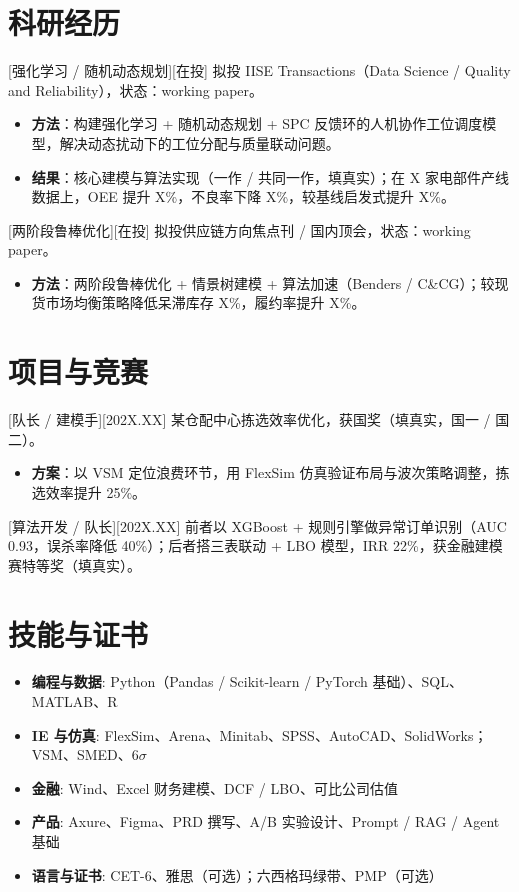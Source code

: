 \documentclass{resume}
\begin{document}
\section{科研经历}

[强化学习 / 随机动态规划][在投]
{ 拟投 IISE Transactions（Data Science / Quality and Reliability），状态：working paper。}

\begin{itemize}
  \item \textbf{方法}：构建强化学习 + 随机动态规划 + SPC 反馈环的人机协作工位调度模型，解决动态扰动下的工位分配与质量联动问题。
  \item \textbf{结果}：核心建模与算法实现（一作 / 共同一作，填真实）；在 X 家电部件产线数据上，OEE 提升 X\%，不良率下降 X\%，较基线启发式提升 X\%。
\end{itemize}

[两阶段鲁棒优化][在投]
{ 拟投供应链方向焦点刊 / 国内顶会，状态：working paper。}

\begin{itemize}
  \item \textbf{方法}：两阶段鲁棒优化 + 情景树建模 + 算法加速（Benders / C\&CG）；较现货市场均衡策略降低呆滞库存 X\%，履约率提升 X\%。
\end{itemize}


\section{项目与竞赛}

[队长 / 建模手][202X.XX]
{ 某仓配中心拣选效率优化，获国奖（填真实，国一 / 国二）。}

\begin{itemize}
  \item \textbf{方案}：以 VSM 定位浪费环节，用 FlexSim 仿真验证布局与波次策略调整，拣选效率提升 25\%。
\end{itemize}

[算法开发 / 队长][202X.XX]
{ 前者以 XGBoost + 规则引擎做异常订单识别（AUC 0.93，误杀率降低 40\%）；后者搭三表联动 + LBO 模型，IRR 22\%，获金融建模赛特等奖（填真实）。}


\section{技能与证书}
\begin{itemize}
\item \textbf{编程与数据}:  Python（Pandas / Scikit-learn / PyTorch 基础）、SQL、MATLAB、R
\item \textbf{IE 与仿真}:  FlexSim、Arena、Minitab、SPSS、AutoCAD、SolidWorks；VSM、SMED、6$\sigma$
\item \textbf{金融}:  Wind、Excel 财务建模、DCF / LBO、可比公司估值
\item \textbf{产品}:  Axure、Figma、PRD 撰写、A/B 实验设计、Prompt / RAG / Agent 基础
\item \textbf{语言与证书}:  CET-6、雅思（可选）；六西格玛绿带、PMP（可选）
\end{itemize}
\end{document}

